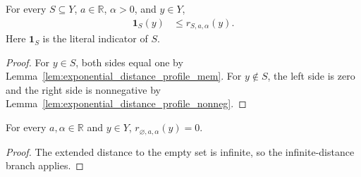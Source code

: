 \begin{lemma}
    \label{lem:indicator_le_exponential_distance_profile}
    \leanok
    For every $S\subseteq Y$, $a\in\mathbb R$, $\alpha>0$, and $y\in Y$,
    \begin{align}
        \mathbf 1_S(y) & \leq r_{S,a,\alpha}(y).
        \label{eq:indicator_le_exponential_distance_profile}
    \end{align}
    Here $\mathbf 1_S$ is the literal indicator of $S$.
\end{lemma}
\begin{proof}
    \leanok
    For $y\in S$, both sides equal one by
    Lemma~\ref{lem:exponential_distance_profile_mem}.
    For $y\notin S$, the left side is zero and the right side is
    nonnegative by Lemma~\ref{lem:exponential_distance_profile_nonneg}.
\end{proof}

\begin{lemma}
    \label{lem:exponential_distance_profile_empty}
    \leanok
    For every $a,\alpha\in\mathbb R$ and $y\in Y$,
    $r_{\varnothing,a,\alpha}(y)=0$.
\end{lemma}
\begin{proof}
    \leanok
    The extended distance to the empty set is infinite, so the
    infinite-distance branch applies.
\end{proof}

